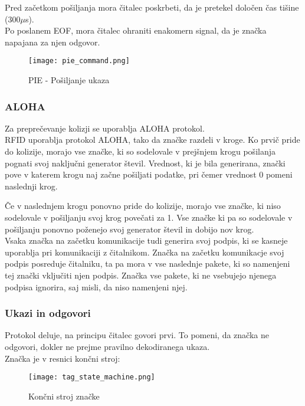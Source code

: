 \documentclass[]{article}
\begin{document}
Pred za\v{c}etkom po\v{s}iljanja mora \v{c}italec poskrbeti, da je
pretekel dolo\v{c}en \v{c}as ti\v{s}ine (300$\mu$s). \\
Po poslanem EOF, mora \v{c}italec ohraniti enakomern signal, da
je zna\v{c}ka napajana za njen odgovor.
 
\begin{figure}[H] %
  \centering
  \texttt{[image: pie\_command.png]}
  \caption{PIE - Po\v{s}iljanje ukaza}
\end{figure}


\subsubsection{ALOHA}
Za prepre\v{c}evanje kolizji se uporablja ALOHA protokol. \\

\noindent
RFID uporablja protokol ALOHA, tako da zna\v{c}ke razdeli v kroge.
Ko prvi\v{c} pride do kolizije, morajo vse zna\v{c}ke, ki so
sodelovale v prej\v{s}njem krogu po\v{s}ilanja pognati svoj
naklju\v{c}ni generator \v{s}tevil. Vrednost, ki je bila generirana,
zna\v{c}ki pove v katerem krogu naj za\v{c}ne po\v{s}iljati podatke,
pri \v{c}emer vrednost 0 pomeni naslednji krog.

\v{C}e v naslednjem krogu ponovno pride do kolizije, morajo vse
zna\v{c}ke, ki niso sodelovale v po\v{s}iljanju svoj krog pove\v{c}ati
za 1. Vse zna\v{c}ke ki pa so sodelovale v po\v{s}iljanju ponovno
po\v{z}enejo svoj generator \v{s}tevil in dobijo nov krog. \\

\noindent
Vsaka zna\v{c}ka na za\v{c}etku komunikacije tudi generira svoj
podpis, ki se kasneje uporablja pri komunikaciji z \v{c}italnikom.
Zna\v{c}ka na za\v{c}etku komunikacje svoj podpis posreduje
\v{c}italniku, ta pa mora v vse naslednje pakete, ki so namenjeni tej
zna\v{c}ki vklju\v{c}iti njen podpis. Zna\v{c}ka vse pakete, ki ne
vsebujejo njenega podpisa ignorira, saj misli, da niso namenjeni njej.

\clearpage
\subsubsection{Ukazi in odgovori}
Protokol deluje, na principu \v{c}italec govori prvi. To pomeni,
da zna\v{c}ka ne odgovori, dokler ne prejme pravilno dekodiranega
ukaza. \\

\noindent
Zna\v{c}ka je v resnici kon\v{c}ni stroj:
\begin{figure}[H] %
  \centering
  \texttt{[image: tag\_state\_machine.png]}
  \caption{Kon\v{c}ni stroj zna\v{c}ke}
\end{figure}
\end{document}
